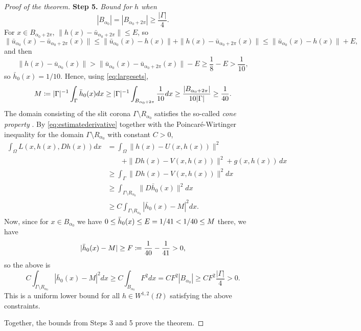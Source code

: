 \documentclass{article}
\theoremstyle{definition}
\theoremstyle{remark}
\newcommand{\denomE}{41}
\newcommand{\denomxi}{10}
\newcommand{\denomA}{4}
\newcommand{\uu}{u}
\begin{document}
\begin{proof}[Proof of the theorem]
\noindent\textbf{Step 5.} \emph{Bound for $h$ when} 
\begin{equation}\label{eq:largesets}
|B_{\alpha_0}|=|B_{{\alpha_0}+2\pi}|\geq \frac{|\Gamma|}{\denomA}.
\end{equation}
For $x\in B_{\alpha_0+2\pi}$, $\|h(x)-\bar \uu_{\alpha_0+2\pi}\|\leq E$, so 
\[
 \|\bar \uu_{\alpha_0}(x)-\bar \uu_{\alpha_0+2\pi}(x)\|
 \leq\|\bar \uu_{\alpha_0}(x)-h(x)\|+\|h(x)-\bar \uu_{\alpha_0+2\pi}(x)\|\leq \|\bar \uu_{\alpha_0}(x)-h(x)\|+E,
\]
and then
\[\|h(x)-\bar \uu_{\alpha_0}(x)\|>\|\bar\uu_{\alpha_0}(x)-\bar \uu_{\alpha_0+2\pi}(x)\|-E\geq \frac18-E>\frac1{10},\]
%
so $\bar h_0(x)=1/10$.
Hence, using \eqref{eq:largesets},
\[M\coloneqq |\Gamma|^{-1}\int_\Gamma \bar h_0(x)dx\geq|\Gamma|^{-1}\int_{B_{\alpha_0+2\pi}} \frac 1{\denomxi} dx\geq\frac{|B_{\alpha_0+2\pi}|}{\denomxi|\Gamma|}\geq\frac{1}{ \the\numexpr\denomxi*\denomA\relax}.%
\]
The domain consisting of the slit corona $\Gamma\setminus R_{\alpha_0}$ satisfies the so-called \emph{cone property} \cite[Definition 2.5.14]{gasipapa}.
By \eqref{eq:estimatederivative} together with the Poincar\'e-Wirtinger inequality \cite[Theorem 2.5.21]{gasipapa} for the domain $\Gamma\setminus R_{\alpha_0}$ with constant $C>0$,
\begin{align*}
    \int_\Omega L(x,h(x),Dh(x))dx&=\int_\Omega \|h(x)-U(x,h(x))\|^2 \\
    &\qquad +\|Dh(x)-V(x,h(x))\|^2+g(x,h(x))\,dx\\
    &\geq \int_\Gamma  \|Dh(x)-V(x,h(x))\|^2dx\\
    &\geq \int_{\Gamma\setminus R_{\alpha_0}}  \|D\bar h_0(x)\|^2dx\\
    &\geq C \int_{\Gamma\setminus R_{\alpha_0}}\left|\bar h_0(x)-M\right|^2dx.
\end{align*}
%
Now, since for $x\in B_{\alpha_0}$ we have $0\leq \bar h_0(x)\leq  E=1/\denomE<1/{ \the\numexpr\denomxi*\denomA\relax}\leq M$ there,  we have
\[|\bar h_0(x)-M|\geq F\coloneqq\frac{1}{ \the\numexpr\denomxi*\denomA\relax}-\frac{1}{ \denomE}>0,\]
so the above is
\begin{equation*}
    C \int_{\Gamma\setminus R_{\alpha_0}}\left|\bar h_0(x)-M\right|^2dx\geq C
    \int_{B_{\alpha_0}}   F^2dx= CF^2 |B_{\alpha_0}|\geq CF^2\frac{|\Gamma|}{\denomA}>0.
\end{equation*}
This is a uniform lower bound for all $h\in W^{1,2}(\Omega)$ satisfying the above constraints. 

Together, the bounds from Steps 3 and 5 prove the theorem.
\end{proof}
\end{document}
